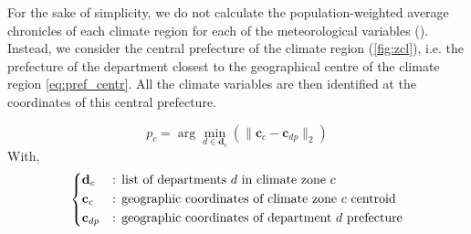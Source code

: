\documentclass[11pt]{article}
\begin{document}
        For the sake of simplicity, we do not calculate the population-weighted average chronicles of each climate region for each of the meteorological variables (\cite{cros_comparative_2025}). Instead, we consider the central prefecture of the climate region (\ref{fig:zcl}), i.e. the prefecture of the department closest to the geographical centre of the climate region \eqref{eq:pref_centr}. All the climate variables are then identified at the coordinates of this central prefecture. 

        \begin{equation}
            \label{eq:pref_centr}
            p_c = \arg \min_{d \in \mathbf{d}_c} \left(\|\mathbf{c}_c - \mathbf{c}_{dp}\|_2 \right)
        \end{equation}
        With,
        $$
        \begin{dcases}
            \mathbf{d}_c&\text{: list of departments $d$ in climate zone $c$}\\
            \mathbf{c}_c&\text{: geographic coordinates of climate zone $c$ centroid}\\
            \mathbf{c}_{dp}&\text{: geographic coordinates of department $d$ prefecture}\\
        \end{dcases}
        $$
\end{document}
